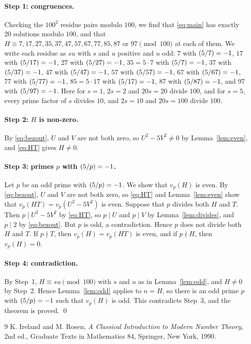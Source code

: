 \documentclass[11pt]{article}
\newcommand{\leg}[2]{\mathchoice{\biggl(\dfrac{#1}{#2}\biggr)}{(#1/#2)}{(#1/#2)}{(#1/#2)}}
\begin{document}
\paragraph{Step 1: congruences.} Checking the $100^2$ residue pairs modulo $100$, we find that \eqref{eq:main} has exactly 20 solutions modulo $100$, and that $H\equiv7,\allowbreak 17,\allowbreak 27,\allowbreak 35,\allowbreak 37,\allowbreak 47,\allowbreak 57,\allowbreak 67,\allowbreak 77,\allowbreak 85,\allowbreak 87\text{ or }97\pmod{100}$ at each of them. We write each residue as $su$ with $s$ and $u$ positive and $u$ odd: $7$ with $\leg{5}{7}=-1$, $17$ with $\leg{5}{17}=-1$, $27$ with $\leg{5}{27}=-1$, $35=5\cdot7$ with $\leg{5}{7}=-1$, $37$ with $\leg{5}{37}=-1$, $47$ with $\leg{5}{47}=-1$, $57$ with $\leg{5}{57}=-1$, $67$ with $\leg{5}{67}=-1$, $77$ with $\leg{5}{77}=-1$, $85=5\cdot17$ with $\leg{5}{17}=-1$, $87$ with $\leg{5}{87}=-1$, and $97$ with $\leg{5}{97}=-1$. Here for $s=1$, $2s=2$ and $20s=20$ divide $100$, and for $s=5$, every prime factor of $s$ divides $10$, and $2s=10$ and $20s=100$ divide $100$.

\paragraph{Step 2: $H$ is non-zero.} By \eqref{eq:bezout}, $U$ and $V$ are not both zero, so $U^2-5V^2\neq0$ by Lemma~\ref{lem:even}, and \eqref{eq:HT} gives $H\neq0$.

\paragraph{\texorpdfstring{Step 3: primes $p$ with $\leg{5}{p}=-1$.}{Step 3: inert primes.}} Let $p$ be an odd prime with $\leg{5}{p}=-1$. We show that $v_p(H)$ is even. By \eqref{eq:bezout}, $U$ and $V$ are not both zero, so \eqref{eq:HT} and Lemma~\ref{lem:even} show that $v_p(HT)=v_p(U^2-5V^2)$ is even. Suppose that $p$ divides both $H$ and $T$. Then $p\mid U^2-5V^2$ by \eqref{eq:HT}, so $p\mid U$ and $p\mid V$ by Lemma~\ref{lem:divides}, and $p\mid 2$ by \eqref{eq:bezout}. But $p$ is odd, a contradiction. Hence $p$ does not divide both $H$ and $T$. If $p\nmid T$, then $v_p(H)=v_p(HT)$ is even, and if $p\nmid H$, then $v_p(H)=0$.

\paragraph{Step 4: contradiction.} By Step~1, $H\equiv su\pmod{100}$ with $s$ and $u$ as in Lemma~\ref{lem:odd}, and $H\neq0$ by Step~2. Hence Lemma~\ref{lem:odd} applies to $n=H$, so there is an odd prime $p$ with $\leg{5}{p}=-1$ such that $v_p(H)$ is odd. This contradicts Step~3, and the theorem is proved.
\qed

\begin{thebibliography}{9}
 K. Ireland and M. Rosen, \emph{A Classical Introduction to Modern Number Theory}, 2nd ed., Graduate Texts in Mathematics 84, Springer, New York, 1990.
\end{thebibliography}
\end{document}
